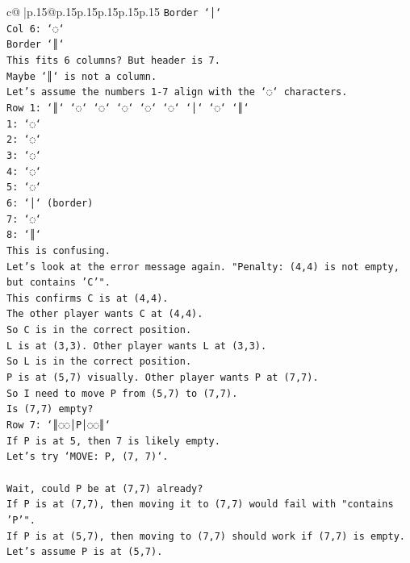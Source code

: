 \documentclass{article}
\begin{document}
{\begin{supertabular}{c@{$\;$}|p{.15\linewidth}@{}p{.15\linewidth}p{.15\linewidth}p{.15\linewidth}p{.15\linewidth}p{.15\linewidth}}
{{{\texttt{Border `│`} \\
\texttt{Col 6: `◌`} \\
\texttt{Border `║`} \\
\texttt{This fits 6 columns? But header is 7.} \\
\texttt{Maybe `║` is not a column.} \\
\texttt{Let's assume the numbers 1{-}7 align with the `◌` characters.} \\
\texttt{Row 1: `║` `◌` `◌` `◌` `◌` `◌` `│` `◌` `║`} \\
\texttt{1: `◌`} \\
\texttt{2: `◌`} \\
\texttt{3: `◌`} \\
\texttt{4: `◌`} \\
\texttt{5: `◌`} \\
\texttt{6: `│` (border)} \\
\texttt{7: `◌`} \\
\texttt{8: `║`} \\
\texttt{This is confusing.} \\
\texttt{Let's look at the error message again. "Penalty: (4,4) is not empty, but contains 'C'".} \\
\texttt{This confirms C is at (4,4).} \\
\texttt{The other player wants C at (4,4).} \\
\texttt{So C is in the correct position.} \\
\texttt{L is at (3,3). Other player wants L at (3,3).} \\
\texttt{So L is in the correct position.} \\
\texttt{P is at (5,7) visually. Other player wants P at (7,7).} \\
\texttt{So I need to move P from (5,7) to (7,7).} \\
\texttt{Is (7,7) empty?} \\
\texttt{Row 7: `║◌◌│P│◌◌║`} \\
\texttt{If P is at 5, then 7 is likely empty.} \\
\texttt{Let's try `MOVE: P, (7, 7)`.} \\
\\ 
\texttt{Wait, could P be at (7,7) already?} \\
\texttt{If P is at (7,7), then moving it to (7,7) would fail with "contains 'P'".} \\
\texttt{If P is at (5,7), then moving to (7,7) should work if (7,7) is empty.} \\
\texttt{Let's assume P is at (5,7).} \\
}}}
\end{supertabular}}
\end{document}
